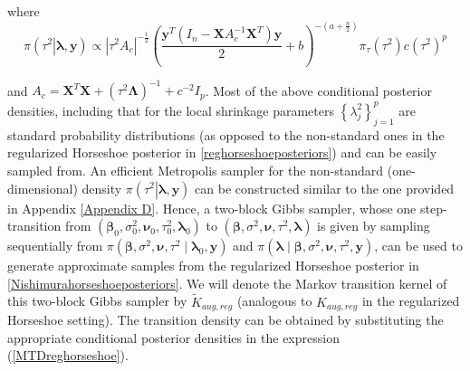 \documentclass[noinfoline,11pt]{imsart}
\numberwithin{equation}{section}
\theoremstyle{plain}
\newcommand{\y}{\mathbf{y}}
\newcommand{\X}{\mathbf{X}}
\newcommand{\bl}{\boldsymbol{\lambda}}
\newcommand{\Bl}{\boldsymbol{\Lambda}}
\begin{document}
\noindent
where 
$$
\pi\left(\left.\tau^2\right|\bl,\y\right)\propto\left|\tau^2 A_c\right|^{-\frac{1}{2}}\left(\frac{\y^T\left(I_n-\X A_c^{-1}\X^T\right)\y}{2}+b\right)^{-\left(a+\frac{n}{2}\right)}\pi_\tau\left(\tau^2\right) c(\tau^2)^p 
$$

\noindent
and $A_c=\X^T\X+\left(\tau^2\Bl\right)^{-1}+c^{-2}I_p$. Most of the above conditional posterior densities, including that for the local shrinkage parameters $\left\{\lambda_j^2\right\}_{j=1}^p$ are standard probability distributions (as opposed to the non-standard ones in the regularized Horseshoe posterior in \eqref{reghorseshoeposteriors}) and can be easily sampled from. An efficient Metropolis sampler for the non-standard (one-dimensional) density  $\pi\left(\left.\tau^2\right|\bl,\y\right)$ can be constructed similar to the one provided in Appendix \ref{Appendix D}. Hence, a two-block Gibbs sampler, whose one step-transition from $({\boldsymbol \beta}_0, \sigma^2_0, {\boldsymbol \nu}_0, \tau^2_0, {\boldsymbol \lambda}_0)$ to 
$({\boldsymbol \beta}, \sigma^2, {\boldsymbol \nu}, \tau^2, {\boldsymbol \lambda})$ is given by sampling sequentially from $\pi({\boldsymbol \beta}, \sigma^2, {\boldsymbol \nu}, \tau^2 \mid {\boldsymbol \lambda}_0, \y)$ and 
$\pi({\boldsymbol \lambda} \mid {\boldsymbol \beta}, \sigma^2, {\boldsymbol \nu}, \tau^2, \y)$, can be used to generate approximate samples from the regularized Horseshoe posterior in \eqref{Nishimurahorseshoeposteriors}. We will denote the Markov transition kernel of this two-block Gibbs sampler by $\tilde K_{aug,reg}$ (analogous to $K_{aug,reg}$ in the regularized Horseshoe setting). The transition 
density can be obtained by substituting the appropriate conditional posterior  densities in the expression (\ref{MTDreghorseshoe}). 
\end{document}
